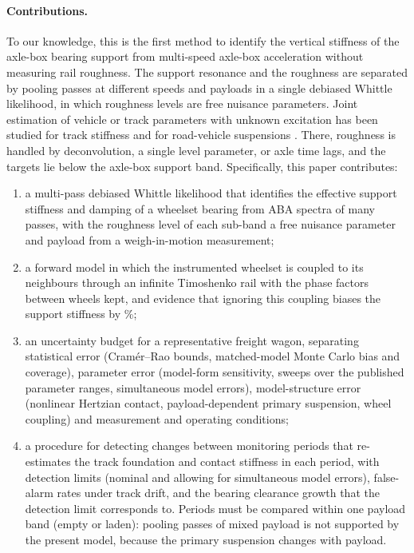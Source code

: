 \paragraph{Contributions.}
To our knowledge, this is the first method to identify the vertical stiffness of the axle-box bearing
support from multi-speed axle-box acceleration without measuring rail roughness. The support resonance
and the roughness are separated by pooling passes at different speeds and payloads in a single
debiased Whittle likelihood, in which roughness levels are free nuisance parameters. Joint estimation
of vehicle or track parameters with unknown excitation has been studied for track stiffness
\citep{carrigan2023,shen2023} and for road-vehicle suspensions \citep{liu2024,an2024}. There, roughness
is handled by deconvolution, a single level parameter, or axle time lags, and the targets lie below the
axle-box support band. Specifically, this paper contributes:
\begin{enumerate}
\item a multi-pass debiased Whittle likelihood that identifies the effective support stiffness and
damping of a wheelset bearing from ABA spectra of many passes, with the roughness level of each
sub-band a free nuisance parameter and payload from a weigh-in-motion measurement;
\item a forward model in which the instrumented wheelset is coupled to its neighbours through an
infinite Timoshenko rail with the phase factors between wheels kept, and evidence that ignoring this
coupling biases the support stiffness by \IgnoreCouplingForty\%;
\item an uncertainty budget for a representative freight wagon, separating statistical error
(Cram\'er--Rao bounds, matched-model Monte Carlo bias and coverage), parameter error (model-form
sensitivity, sweeps over the published parameter ranges, simultaneous model errors), model-structure error
(nonlinear Hertzian contact, payload-dependent primary suspension, wheel coupling) and measurement and
operating conditions;
\item a procedure for detecting changes between monitoring periods that re-estimates the track
foundation and contact stiffness in each period, with detection limits (nominal and allowing for
simultaneous model errors), false-alarm rates under track drift, and the bearing clearance growth that
the detection limit corresponds to. Periods must be compared within one payload band (empty or laden):
pooling passes of mixed payload is not supported by the present model, because the primary suspension
changes with payload.
\end{enumerate}

